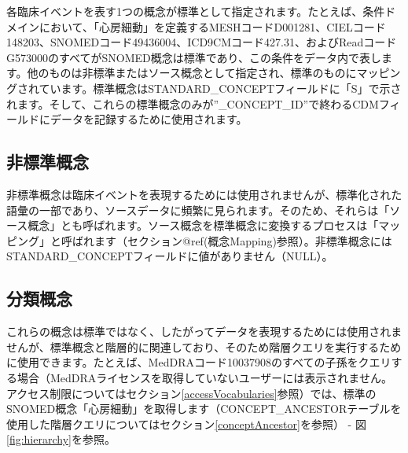\documentclass[
  11pt]{book}
\theoremstyle{definition}
\theoremstyle{definition}
\theoremstyle{definition}
\theoremstyle{definition}
\theoremstyle{remark}
\begin{document}
各臨床イベントを表す1つの概念が標準として指定されます。たとえば、条件ドメインにおいて、「心房細動」を定義するMESHコードD001281、CIELコード148203、SNOMEDコード49436004、ICD9CMコード427.31、およびReadコードG573000のすべてがSNOMED概念は標準であり、この条件をデータ内で表します。他のものは非標準またはソース概念として指定され、標準のものにマッピングされています。標準概念はSTANDARD\_CONCEPTフィールドに「S」で示されます。そして、これらの標準概念のみが''\_CONCEPT\_ID''で終わるCDMフィールドにデータを記録するために使用されます。 

\subsection{非標準概念}\label{ux975eux6a19ux6e96ux6982ux5ff5}

非標準概念は臨床イベントを表現するためには使用されませんが、標準化された語彙の一部であり、ソースデータに頻繁に見られます。そのため、それらは「ソース概念」とも呼ばれます。ソース概念を標準概念に変換するプロセスは「マッピング」と呼ばれます（セクション@ref(概念Mapping)参照）。非標準概念にはSTANDARD\_CONCEPTフィールドに値がありません（NULL）。

\subsection{分類概念}\label{ux5206ux985eux6982ux5ff5}

これらの概念は標準ではなく、したがってデータを表現するためには使用されませんが、標準概念と階層的に関連しており、そのため階層クエリを実行するために使用できます。たとえば、MedDRAコード10037908のすべての子孫をクエリする場合（MedDRAライセンスを取得していないユーザーには表示されません。アクセス制限についてはセクション\ref{accessVocabularies}参照）では、標準のSNOMED概念「心房細動」を取得します（CONCEPT\_ANCESTORテーブルを使用した階層クエリについてはセクション\ref{conceptAncestor}を参照） - 図\ref{fig:hierarchy}を参照。 
\end{document}
